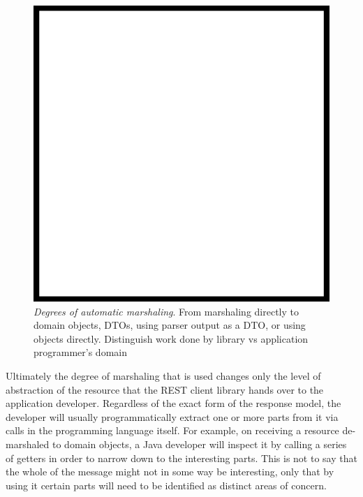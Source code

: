\documentclass[]{article}
\makeatletter
\def\maxwidth{\ifdim\Gin@nat@width>\linewidth\linewidth
\else\Gin@nat@width\fi}
\let\Oldincludegraphics\includegraphics
\renewcommand{\includegraphics}[1]{\Oldincludegraphics[width=\maxwidth]{#1}}
\makeatother
\begin{document}
\begin{figure}[htbp]
\centering
\includegraphics{images/placeholder.png}
\caption{\emph{Degrees of automatic marshaling}. From marshaling
directly to domain objects, DTOs, using parser output as a DTO, or using
objects directly. Distinguish work done by library vs application
programmer's domain}
\end{figure}

Ultimately the degree of marshaling that is used changes only the level
of abstraction of the resource that the REST client library hands over
to the application developer. Regardless of the exact form of the
response model, the developer will usually programmatically extract one
or more parts from it via calls in the programming language itself. For
example, on receiving a resource de-marshaled to domain objects, a Java
developer will inspect it by calling a series of getters in order to
narrow down to the interesting parts. This is not to say that the whole
of the message might not in some way be interesting, only that by using
it certain parts will need to be identified as distinct areas of
concern.
\end{document}
